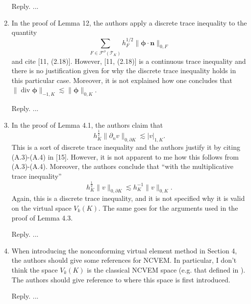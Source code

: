 \documentclass[10pt]{amsart}
\theoremstyle{definition}
\theoremstyle{remark}
\renewcommand{\div}{\operatorname{div}}
\begin{document}
\begin{enumerate}[1.]
\smallskip \noindent \textcolor[rgb]{1.00,0.00,0.00}{Reply.}
...

\medskip

\item \textsf{In the proof of Lemma 12, the authors apply a discrete trace inequality to the
quantity 
$$
\sum_{F\in\mathcal F^{\partial}(\mathcal T_K)}h_F^{1/2}\|\boldsymbol{\phi}\cdot\boldsymbol{n}\|_{0,F}
$$
and cite [11, (2.18)]. However, [11, (2.18)] is a continuous trace inequality and there is no justification given for why the discrete trace inequality holds in this particular case. Moreover, it is not explained how one concludes that $\|\div\boldsymbol{\phi}\|_{-1,K}\lesssim \|\boldsymbol{\phi}\|_{0,K}$.}

\smallskip \noindent \textcolor[rgb]{1.00,0.00,0.00}{Reply.}
...

\medskip

\item \textsf{In the proof of Lemma 4.1, the authors claim that
$$
h_K^{\frac{1}{2}}\|\partial_nv\|_{0,\partial K}\lesssim |v|_{1,K}.
$$
This is a sort of discrete trace inequality and the authors justify it by citing (A.3)-(A.4) in [15]. However, it is not apparent to me how this follows from (A.3)-(A.4). Moreover, the authors conclude that “with the multiplicative trace inequality”
$$
h_K^{\frac{1}{2}}\|v\|_{0,\partial K}\lesssim h_K^{-1}\|v\|_{0,K}.
$$
Again, this is a discrete trace inequality, and it is not specified why it is valid on the virtual space $V_k(K)$. The same goes for the arguments used in the proof of Lemma 4.3.}

\smallskip \noindent \textcolor[rgb]{1.00,0.00,0.00}{Reply.}
...

\medskip

\item \textsf{When introducing the nonconforming virtual element method in Section 4, the authors should give some references for NCVEM. In particular, I don’t think the space $V_k(K)$ is the classical NCVEM space (e.g. that defined in \cite{AyusodeDiosLipnikovManzini2016}). The authors should give reference to where this space is first introduced.}

\smallskip \noindent \textcolor[rgb]{1.00,0.00,0.00}{Reply.}
...

\medskip


\end{enumerate}
\end{document}
